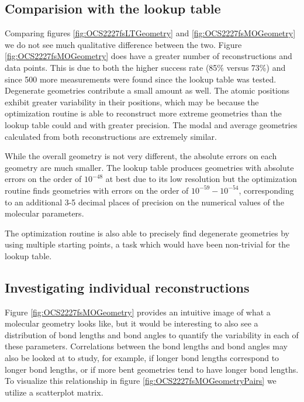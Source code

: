 
\subsection{Comparision with the lookup table}
Comparing figures \ref{fig:OCS2227fsLTGeometry} and \ref{fig:OCS2227fsMOGeometry} we do not see much qualitative difference between the two. Figure \ref{fig:OCS2227fsMOGeometry} does have a greater number of reconstructions and data points. This is due to both the higher success rate (85\% versus 73\%) and since 500 more measurements were found since the lookup table was tested. Degenerate geometries contribute a small amount as well. The atomic positions exhibit greater variability in their positions, which may be because the optimization routine is able to reconstruct more extreme geometries than the lookup table could and with greater precision. The modal and average geometries calculated from both reconstructions are extremely similar.

While the overall geometry is not very different, the absolute errors on each geometry are much smaller. The lookup table produces geometries with absolute errors on the order of $10^{-48}$ at best due to its low resolution but the optimization routine finds geometries with errors on the order of $10^{-59} - 10^{-54}$, corresponding to an additional 3-5 decimal places of precision on the numerical values of the molecular parameters.

The optimization routine is also able to precisely find degenerate geometries by using multiple starting points, a task which would have been non-trivial for the lookup table.

\subsection{Investigating individual reconstructions}
Figure \ref{fig:OCS2227fsMOGeometry} provides an intuitive image of what a molecular geometry looks like, but it would be interesting to also see a distribution of bond lengths and bond angles to quantify the variability in each of these parameters. Correlations between the bond lengths and bond angles may also be looked at to study, for example, if longer  bond lengths correspond to longer  bond lengths, or if more bent geometries tend to have longer bond lengths. To visualize this relationship in figure \ref{fig:OCS2227fsMOGeometryPairs} we utilize a scatterplot matrix.

